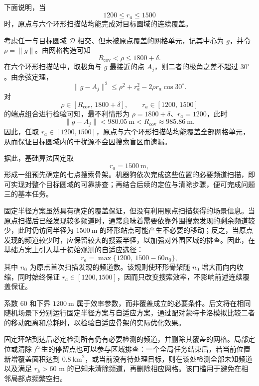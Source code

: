 下面说明，当
\begin{equation}
1200\le r_a\le1500
\end{equation}
时，原点与六个环形扫描站均能完成对目标圆域的连续覆盖。

考虑任一与目标圆域 $\mathcal D$ 相交、但未被原点覆盖的网格单元，记其中心为 $g$，并令 $\rho=\|g\|$。由网格构造可知
\begin{equation}
R_{\mathrm{cov}}<\rho\le1800+\delta.
\end{equation}
在六个环形扫描站中，取极角与 $g$ 最接近的点 $A_j$，则二者的极角之差不超过 $30^\circ$。由余弦定理，
\begin{equation}
\|g-A_j\|^2
\le
\rho^2+r_a^2-2\rho r_a\cos30^\circ.
\end{equation}
对
\[
\rho\in[R_{\mathrm{cov}},\,1800+\delta],
\qquad
r_a\in[1200,\,1500]
\]
的端点组合进行检验可知，最不利情形为
$\rho=1800+\delta$、$r_a=1200$，此时
\begin{equation}
\|g-A_j\|<980.05\ \mathrm m
<R_{\mathrm{cov}}\approx985.86\ \mathrm m.
\end{equation}
因此，任取 $r_a\in[1200,1500]$，原点与六个环形扫描站均能覆盖全部网格单元，从而保证目标圆域内的干扰源不会因搜索盲区而遗漏。

据此，基础算法固定取
\begin{equation}
r_a=1500\ \mathrm m,
\end{equation}
形成一组预先确定的七点搜索骨架。机器狗依次完成这些位置的必要频道扫描，即可实现对整个目标圆域的可靠排查；再结合后续的定位与清除步骤，便可完成问题三的基本任务。

固定半径方案虽然具有确定的覆盖保证，但没有利用原点扫描获得的场景信息。当原点扫描后已经发现较多频道时，通常意味着需要依靠外围搜索发现的剩余频道较少，此时仍访问半径为 $1500\ \mathrm m$ 的环形站点可能产生不必要的移动；反之，当原点发现的频道较少时，应保留较大的搜索半径，以加强对外围区域的排查。因此，在基础方案上引入基于初始观测的自适应选径：
\begin{equation}
r_a=\max\{1200,\ 1500-60n_0\},
\label{eq:p3-anchor-radius}
\end{equation}
其中 $n_0$ 为原点首次扫描发现的频道数。该规则使环形骨架随 $n_0$ 增大而向内收缩，同时始终保证
$r_a\in[1200,1500]$，因而只改变搜索效率，不影响前述连续覆盖保证。

系数 $60$ 和下界 $1200\ \mathrm m$ 属于效率参数，而非覆盖成立的必要条件。后文将在相同随机场景下分别运行固定半径方案与自适应方案，通过配对蒙特卡洛模拟比较二者的移动距离和总耗时，以检验自适应骨架的实际优化效果。

固定环站到达后必定检测所有仍有必要检测的频道，并删除其覆盖的网格。局部定位或清除
产生的停留点也可以参与区域排查：一个全局任务结束后，若当前位置新增覆盖面积达到
$0.8\ \mathrm{km}^2$，或当前没有待处理目标，则在该处检测全部未知频道以及满足
$r_k>60$ m 的已知未清除频道，再删除相应网格。该门槛用于避免在相邻局部点频繁空扫。

